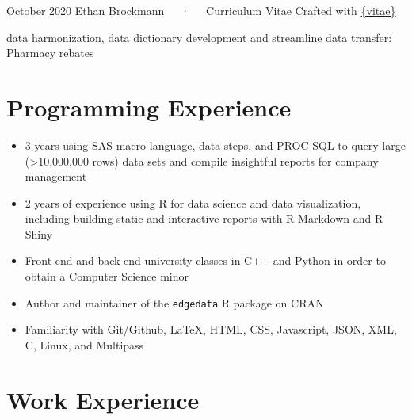 \documentclass[11pt, a4paper]{awesome-cv}
\begin{document}
\makecvheader

\makecvfooter
  {October 2020}
    {Ethan Brockmann~~~·~~~Curriculum Vitae}
  {Crafted with \href{https://github.com/mitchelloharawild/vitae}{\{vitae\}}}




data harmonization, data dictionary development and streamline data transfer: Pharmacy rebates

\hypertarget{programming-experience}{%
\section{Programming Experience}\label{programming-experience}}

\begin{itemize}
\item
  3 years using SAS macro language, data steps, and PROC SQL to query large (\textgreater10,000,000 rows) data sets and compile insightful reports for company management
\item
  2 years of experience using R for data science and data visualization, including building static and interactive reports with R Markdown and R Shiny
\item
  Front-end and back-end university classes in C++ and Python in order to obtain a Computer Science minor
\item
  Author and maintainer of the \texttt{edgedata} R package on CRAN
\item
  Familiarity with Git/Github, \LaTeX, HTML, CSS, Javascript, JSON, XML, C, Linux, and Multipass
\end{itemize}

\hypertarget{work-experience}{%
\section{Work Experience}\label{work-experience}}
\end{document}
